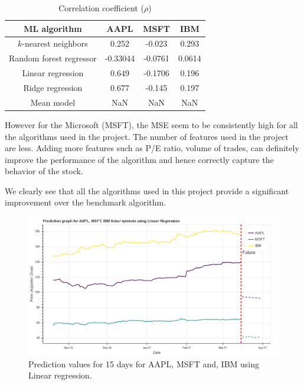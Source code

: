 \documentclass[12pt]{article}
\begin{document}
\begin{table}
\begin{center}
\begin{tabular} {|c|c|c|c|}
\hline \hline
\textbf{ML algorithm} & \textbf{AAPL} & \textbf{MSFT} & \textbf{IBM} \\ \hline
$k$-nearest neighbors &0.252 & -0.023 & 0.293 \\ \hline
Random forest regressor &  -0.33044 & -0.0761 & 0.0614  \\ \hline
Linear regression & 0.649 & -0.1706 & 0.196  \\ \hline
Ridge regression &0.677 & -0.145 & 0.197 \\ \hline
Mean model & NaN & NaN & NaN  \\ \hline
\hline
\end{tabular}
\end{center}
\caption{Correlation coefficient ($\rho$)}
\label{tab:corr}
\end{table}

However for the Microsoft (MSFT), the MSE seem to be consistently high for all the algorithms used in the project. The number of  features used in the project are less. Adding more features such as P/E ratio, volume of trades, can definitely improve the performance of the algorithm and hence correctly capture the behavior of the stock. 

We clearly see that all the algorithms used in this project provide a significant improvement over the benchmark algorithm. 

\begin{figure}[!htbp]
\begin{center}
\includegraphics[height=0.4\textheight,width=\textwidth]{lr_model.png}
\caption{Prediction values for 15 days for AAPL, MSFT and, IBM using Linear regression.}
\label{fig:lr_mdl}
\end{center}
\end{figure}
\end{document}
